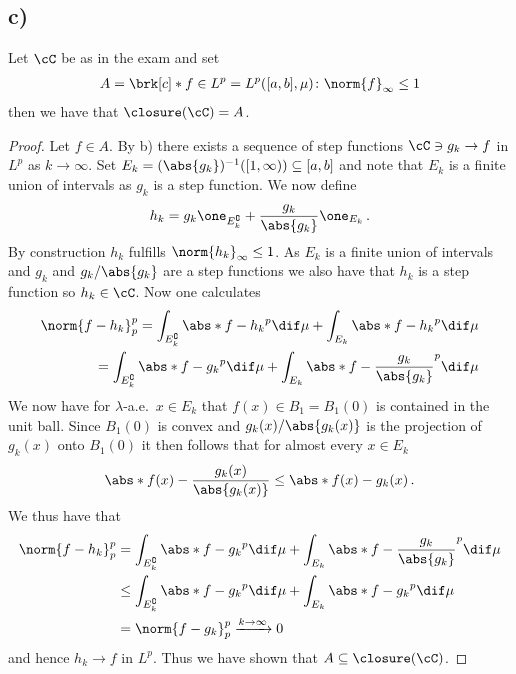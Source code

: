 \subsection{c)}
\begin{claim}
Let $\cC$ be as in the exam and set 
\begin{align*}
	A=\brk[c]*{f\in L^p=L^p([a,b],\mu)\colon\norm{f}_\infty\leq 1}
\end{align*}
then we have that $\closure(\cC)=A$.
\end{claim}
\begin{proof}
Let $f\in A$.
By b) there exists a sequence of step functions $\cC\ni g_k\to f$ in $L^p$ as $k\to\infty$. Set $E_k=(\abs{g_k})^{-1}([1,\infty))\subseteq [a,b]$ and note that $E_k$ is a finite union of intervals as $g_k$ is a step function.
We now define
\begin{align*}
	h_k=g_k\one_{E_k^\complement}+\frac{g_k}{\abs{g_k}}\one_{E_k}\,.
\end{align*}
By construction $h_k$ fulfills $\norm{h_k}_\infty\leq 1$. As $E_k$ is a finite union of intervals and $g_k$ and $g_k/\abs{g_k}$ are a step functions we also have that $h_k$ is a step function so $h_k\in\cC$.
Now one calculates
\begin{align*}
	\norm{f-h_k}_p^p
	= \int_{E_k^\complement}\abs*{f-h_k}^p\dif\mu + \int_{E_k}\abs*{f-h_k}^p\dif\mu \\
	= \int_{E_k^\complement}\abs*{f-g_k}^p\dif\mu + \int_{E_k}\abs*{f-\frac{g_k}{\abs{g_k}}}^p\dif\mu
\end{align*}
We now have for $\lambda$-a.e.\ $x\in E_k$ that $f(x)\in B_1=B_1(0)$ is contained in the unit ball. Since $B_1(0)$ is convex and $g_k(x)/\abs{g_k(x)}$ is the projection of $g_k(x)$ onto $B_1(0)$ it then follows that for almost every $x\in E_k$
\begin{align*}
	\abs*{f(x)-\frac{g_k(x)}{\abs{g_k(x)}}}\leq \abs*{f(x)-g_k(x)}\,.
\end{align*}
We thus have that
\begin{align*}
	\norm{f-h_k}_p^p
	&= \int_{E_k^\complement}\abs*{f-g_k}^p\dif\mu + \int_{E_k}\abs*{f-\frac{g_k}{\abs{g_k}}}^p\dif\mu \\
	&\leq \int_{E_k^\complement}\abs*{f-g_k}^p\dif\mu + \int_{E_k}\abs*{f-g_k}^p\dif\mu \\
	&= \norm{f-g_k}_p^p\xrightarrow{k\to\infty}0
\end{align*}
and hence $h_k\to f$ in $L^p$. Thus we have shown that $A\subseteq \closure(\cC)$.


\end{proof}
